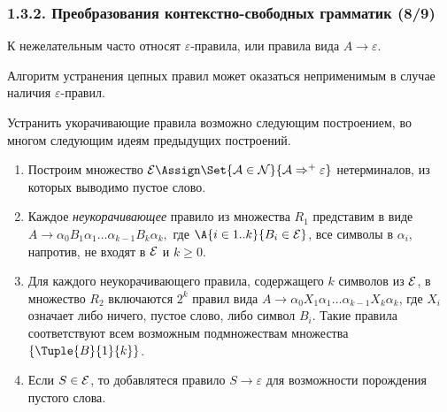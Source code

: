 \begin{frame}
\frametitle{1.3.2. Преобразования контекстно-свободных грамматик (8/9)}

К нежелательным часто относят $\varepsilon$-правила,
или  правила вида $A\to\varepsilon$.

\begin{example}
Алгоритм устранения цепных правил может оказаться
неприменимым в случае наличия $\varepsilon$-правил.
\end{example}

Устранить укорачивающие правила возможно следующим
построением, во многом следующим идеям предыдущих построений. 
 
\begin{enumerate}
\item Построим
множество 
$\cal{E}\Assign\Set{A\in N}{A\Rightarrow^+ \varepsilon}$
нетерминалов, из которых выводимо
пустое слово.
\item Каждое {\em неукорачивающее} 
правило из множества $R_1$ представим в виде\\ 
$A\to \alpha_0 B_1 \alpha_1 \dots
 \alpha_{k-1}B_k\alpha_k,$
где $\A{i\in 1..k}{B_i\in \cal{E}}$, 
все символы в $\alpha_i$, напротив,  
не входят в $\cal{E}$ и $k\ge 0$.
\item Для каждого неукорачивающего правила,
содержащего $k$ символов из $\cal{E}$,
в множество $R_2$ включаются  $2^k$
правил вида
$A\to \alpha_0 X_1 \alpha_1 \dots \alpha_{k-1}X_k\alpha_k$,
где $X_i$ означает либо ничего, пустое слово, либо
символ $B_i$.
Такие правила соответствуют  
всем возможным подмножествам множества 
$\{\Tuple{B}{1}{k}\}$.
\item Если $S\in\cal{E}$, то добавлятеся правило
$S\to \varepsilon$ для возможности порождения пустого слова.
\end{enumerate}

\end{frame}


